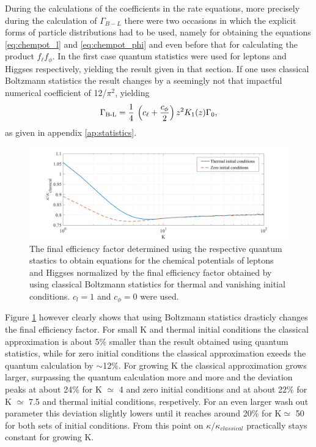 \newpage
During the calculations of the coefficients in the rate equations, more precisely during the calculation of $\Gamma_{B-L}$ there were two occasions in which the explicit forms of particle distributions had to be used, namely for obtaining the equations \eqref{eq:chempot_l} and \eqref{eq:chempot_phi} and even before that for calculating the product $f_\ell f_\phi$. \newline \indent
In the first case quantum statistics were used for leptons and Higgses respectively, yielding the result given in that section. If one uses classical Boltzmann statistics the result changes by a seemingly not that impactful numerical coefficient of 12/$\pi^2$, yielding
\begin{equation}
\Gamma\textsubscript{B-L}=\frac{1}{4}\:\left(c_\ell+\frac{c_\phi}{2}\right)z^2K_1(z)\Gamma_0,
\label{eq:Gamma_B-l_classical}
\end{equation}
as given in appendix \ref{ap:statistics}.
\begin{figure}[H]
	\centering
	\includegraphics[width=\linewidth]{Images/quantum}
	\caption{The final efficiency factor determined using the respective quantum stastics to obtain equations for the chemical potentials of leptons and Higgses normalized by the final efficiency factor obtained by using classical Boltzmann statistics for thermal and vanishing initial conditions. $c_l=1$ and $c_\phi=0$ were used.}
	\label{fig:quantum}
\end{figure} \noindent
{}
Figure \ref{fig:quantum} however clearly shows that using Boltzmann statistics drasticly changes the final efficiency factor. For small K and thermal initial conditions the classical approximation is about 5\% smaller than the result obtained using quantum statistics, while for zero initial conditions the classical approximation exeeds the quantum calculation by $\sim$12\%. For growing K the classical approximation grows larger, surpassing the quantum calculation more and more and the deviation peaks at about 24\% for K $\simeq$ 4 and zero initial conditions and at about 22\% for K $\simeq$ 7.5 and thermal initial conditions, respetively. For an even larger wash out parameter this deviation slightly lowers until it reaches around 20\% for K$\simeq$ 50 for both sets of initial conditions. From this point on $\kappa/\kappa_{classical}$ practically stays constant for growing K.
